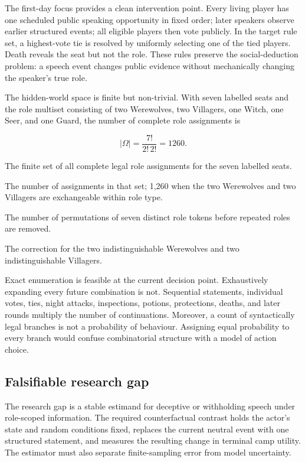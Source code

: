 \documentclass[11pt,a4paper]{article}
\begin{document}
The first-day focus provides a clean intervention point. Every living player has one scheduled public speaking opportunity in fixed order; later speakers observe earlier structured events; all eligible players then vote publicly. In the target rule set, a highest-vote tie is resolved by uniformly selecting one of the tied players. Death reveals the seat but not the role. These rules preserve the social-deduction problem: a speech event changes public evidence without mechanically changing the speaker's true role.

The hidden-world space is finite but non-trivial. With seven labelled seats and the role multiset consisting of two Werewolves, two Villagers, one Witch, one Seer, and one Guard, the number of complete role assignments is

\[
|\Omega|=\frac{7!}{2!\,2!}=1260.
\]

\begin{description}[style=nextline,leftmargin=2.9cm,labelwidth=2.5cm]
  \item[$\Omega$] The finite set of all complete legal role assignments for the seven labelled seats.
  \item[$|\Omega|$] The number of assignments in that set; 1,260 when the two Werewolves and two Villagers are exchangeable within role type.
  \item[$7!$] The number of permutations of seven distinct role tokens before repeated roles are removed.
  \item[$2!\,2!$] The correction for the two indistinguishable Werewolves and two indistinguishable Villagers.
\end{description}

Exact enumeration is feasible at the current decision point. Exhaustively expanding every future combination is not. Sequential statements, individual votes, ties, night attacks, inspections, potions, protections, deaths, and later rounds multiply the number of continuations. Moreover, a count of syntactically legal branches is not a probability of behaviour. Assigning equal probability to every branch would confuse combinatorial structure with a model of action choice.

\subsection{Falsifiable research gap}

The research gap is a stable estimand for deceptive or withholding speech under role-scoped information. The required counterfactual contrast holds the actor's state and random conditions fixed, replaces the current neutral event with one structured statement, and measures the resulting change in terminal camp utility. The estimator must also separate finite-sampling error from model uncertainty.
\end{document}
